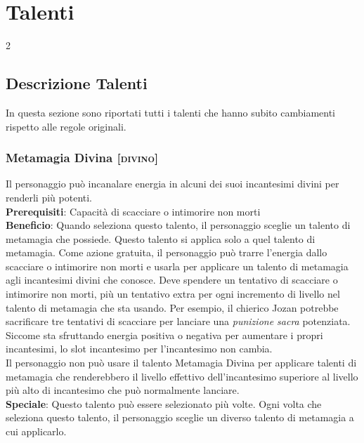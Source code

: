 \documentclass[10pt, a4paper]{report}
\begin{document}
\chapter{Talenti}
\begin{multicols}{2}
\section{Descrizione Talenti}
In questa sezione sono riportati tutti i talenti che hanno subito cambiamenti rispetto alle regole originali.

\subsection{Metamagia Divina [\textsc{divino}]}
Il personaggio può incanalare energia in alcuni dei suoi incantesimi divini per renderli più potenti.\\
\textbf{Prerequisiti}: Capacità di scacciare o intimorire non morti\\
\textbf{Beneficio}: Quando seleziona questo talento, il personaggio sceglie un talento di metamagia che possiede. Questo talento si applica solo a quel talento di metamagia. Come azione gratuita, il personaggio può trarre l'energia dallo scacciare o intimorire non morti e usarla per applicare un talento di metamagia agli incantesimi divini che conosce. Deve spendere un tentativo di scacciare o intimorire non morti, più un tentativo extra per ogni incremento di livello nel talento di metamagia che sta usando. Per esempio, il chierico Jozan potrebbe sacrificare tre tentativi di scacciare per lanciare una \textit{punizione sacra} potenziata. Siccome sta sfruttando energia positiva o negativa per aumentare i propri incantesimi, lo slot incantesimo per l'incantesimo non cambia.\\
Il personaggio non può usare il talento Metamagia Divina per applicare talenti di metamagia che renderebbero il livello effettivo dell’incantesimo superiore al livello più alto di incantesimo che può normalmente lanciare.\\
\textbf{Speciale}: Questo talento può essere selezionato più volte. Ogni volta che seleziona questo talento, il personaggio sceglie un diverso talento di metamagia a cui applicarlo.


\end{multicols}
\end{document}
